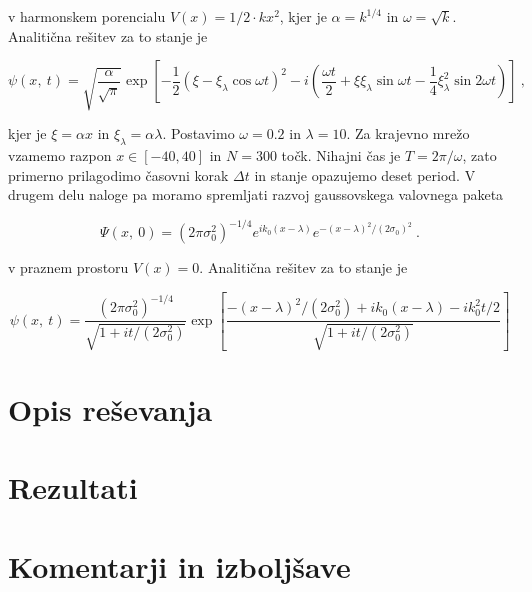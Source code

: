 \documentclass[a4paper]{article}
\begin{document}
v harmonskem porencialu $V(x) = 1/2\cdot k x^2$, kjer je $\alpha = k^{1/4}$ in $\omega = \sqrt{k}$.
Analitična rešitev za to stanje je

\begin{equation}
    \psi(x,\>t) = \sqrt{\frac{\alpha}{\sqrt{\pi}}} \exp{\left[-\frac{1}{2}(\xi - 
    \xi_\lambda \cos{\omega t})^2-
    i\left(\frac{\omega t}{2} + \xi\xi_\lambda \sin{\omega t} - 
    \frac{1}{4}\xi_\lambda^2\sin{2\omega t}\right)\right]}\>,
    \label{analiticna_resitev1}
\end{equation}

kjer je $\xi=\alpha x$ in $\xi_\lambda = \alpha\lambda$. Postavimo $\omega=0.2$ in $\lambda=10$.
Za krajevno mrežo vzamemo razpon $x\in[-40, 40]$ in $N=300$ točk. Nihajni čas je $T=2\pi/\omega$,
zato primerno prilagodimo časovni korak $\Delta t$ in stanje opazujemo deset period. V drugem delu naloge pa moramo spremljati razvoj gaussovskega valovnega paketa 

\begin{equation}
    \Psi(x,\>0) = (2\pi\sigma_0^2)^{-1/4} e^{ik_0(x-\lambda)}e^{-(x-\lambda)^2/(2\sigma_0)^2}\>.
    \label{zacetno_stanje2}
\end{equation}

v praznem prostoru $V(x) = 0$. Analitična rešitev za to stanje je

\begin{equation}
    \psi(x,\>t) = \frac{(2\pi\sigma_0^2)^{-1/4}}{\sqrt{1 + i t/(2\sigma_0^2)}}
    \exp{\left[\frac{-(x-\lambda)^2/(2\sigma_0^2) + ik_0(x-\lambda)-ik_0^2 t/2}
    {\sqrt{1 + i t/(2\sigma_0^2)}}\right]}
    \label{analiticna_resitev2}
\end{equation}
\section{Opis reševanja}

\section{Rezultati}


\section{Komentarji in izboljšave}


\newpage


\end{document}
